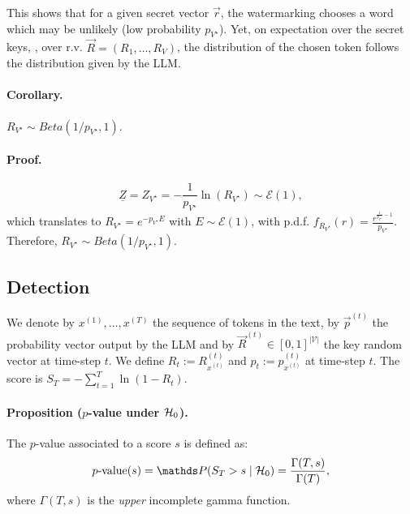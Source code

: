 This shows that for a given secret vector $\vec{r}$, the watermarking chooses a word which may be unlikely (low probability $p_{V^\star}$). 
Yet, on expectation over the secret keys, \ie, over r.v. $\vec{R} = (R_1, \ldots, R_V)$, the distribution of the chosen token follows the distribution given by the LLM.

\paragraph*{Corollary.} $R_{V^\star} \sim Beta(1/p_{V^\star}, 1)$.

\paragraph*{Proof.}
\begin{equation}
\underline{Z}  = Z_{V^\star} = -\frac{1}{p_{V^\star}} \ln(R_{V^\star}) \sim \mathcal{E}(1),
\label{chap5/eq:Coro}
\end{equation}
which translates to $R_{V^\star} = e^{-p_{V^\star} E}$ with $E\sim\mathcal{E}(1)$, with p.d.f. $f_{R_{V^\star}}(r) = \frac{r^{\frac{1}{p_{V^\star}}-1}}{p_{V^\star}}$. 
Therefore, $R_{V^\star} \sim Beta(1/p_{V^\star}, 1)$.

\subsection{Detection}
\label{chap5/app:aaronson_score}

We denote by $x^{(1)}, \ldots, x^{(T)}$ the sequence of tokens in the text, 
by $\vec{p}^{(t)}$ the probability vector output by the LLM and by $\vec{R}^{(t)} \in [0,1]^{|\mathcal{V}|}$ the key random vector at time-step $t$.
We define $R_t := R^{(t)}_{x^{(t)}}$ and $p_t := p^{(t)}_{x^{(t)}}$ at time-step $t$.
The score is $S_T=-\sum_{t=1}^{T} \ln (1-R_t)$.

\paragraph*{Proposition ($p$-value under $\mathcal{H}_0$).}
The $p$-value associated to a score $s$ is defined as:
\begin{equation}
\text{$p$-value}(s) = \Prob(S_T>s \mid \H_0) = \frac{\Gamma(T,s)}{\Gamma(T)},
\end{equation}
where $\Gamma(T,s)$ is the \emph{upper} incomplete gamma function.

